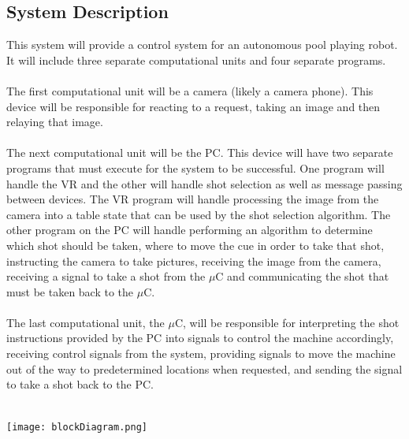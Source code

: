 \documentclass[titlepage]{article}
\begin{document}
\subsection{System Description}
This system will provide a control system for an autonomous pool playing robot. It will include three separate computational units and four separate programs.\\~\\
The first computational unit will be a camera (likely a camera phone). This device will be responsible for reacting to a request, taking an image and then relaying that image.\\~\\
The next computational unit will be the PC. This device will have two separate programs that must execute for the system to be successful. One program will handle the VR and the other will handle shot selection as well as message passing between devices. The VR program will handle processing the image from the camera into a table state that can be used by the shot selection algorithm. The other program on the PC will handle performing an algorithm to determine which shot should be taken, where to move the cue in order to take that shot, instructing the camera to take pictures, receiving the image from the camera, receiving a signal to take a shot from the $\mu$C and communicating the shot that must be taken back to the $\mu$C.\\~\\
The last computational unit, the $\mu$C, will be responsible for interpreting the shot instructions provided by the PC into signals to control the machine accordingly, receiving control signals from the system, providing signals to move the machine out of the way to predetermined locations when requested, and sending the signal to take a shot back to the PC.\\~\\
\begin{center}
	\texttt{[image: blockDiagram.png]}
\label{fig:block diagram}
\end{center}
\newpage
\end{document}
